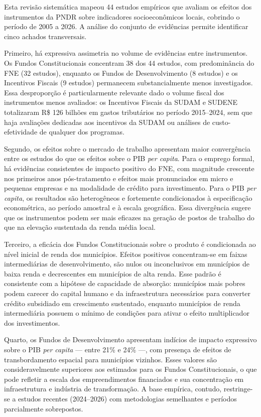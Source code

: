 
Esta revisão sistemática mapeou 44 estudos empíricos que avaliam os efeitos dos instrumentos da PNDR sobre indicadores socioeconômicos locais, cobrindo o período de 2005 a 2026. A análise do conjunto de evidências permite identificar cinco achados transversais.

Primeiro, há expressiva assimetria no volume de evidências entre instrumentos. Os Fundos Constitucionais concentram 38 dos 44 estudos, com predominância do FNE (32 estudos), enquanto os Fundos de Desenvolvimento (8 estudos) e os Incentivos Fiscais (9 estudos) permanecem substancialmente menos investigados. Essa desproporção é particularmente relevante dado o volume fiscal dos instrumentos menos avaliados: os Incentivos Fiscais da SUDAM e SUDENE totalizaram R\$ 126 bilhões em gastos tributários no período 2015--2024, sem que haja avaliações dedicadas aos incentivos da SUDAM ou análises de custo-efetividade de qualquer dos programas.

Segundo, os efeitos sobre o mercado de trabalho apresentam maior convergência entre os estudos do que os efeitos sobre o PIB \textit{per capita}. Para o emprego formal, há evidências consistentes de impacto positivo do FNE, com magnitude crescente nos primeiros anos pós-tratamento e efeitos mais pronunciados em micro e pequenas empresas e na modalidade de crédito para investimento. Para o PIB \textit{per capita}, os resultados são heterogêneos e fortemente condicionados à especificação econométrica, ao período amostral e à escala geográfica. Essa divergência sugere que os instrumentos podem ser mais eficazes na geração de postos de trabalho do que na elevação sustentada da renda média local.

Terceiro, a eficácia dos Fundos Constitucionais sobre o produto é condicionada ao nível inicial de renda dos municípios. Efeitos positivos concentram-se em faixas intermediárias de desenvolvimento, são nulos ou inconclusivos em municípios de baixa renda e decrescentes em municípios de alta renda. Esse padrão é consistente com a hipótese de capacidade de absorção: municípios mais pobres podem carecer do capital humano e da infraestrutura necessários para converter crédito subsidiado em crescimento sustentado, enquanto municípios de renda intermediária possuem o mínimo de condições para ativar o efeito multiplicador dos investimentos.

Quarto, os Fundos de Desenvolvimento apresentam indícios de impacto expressivo sobre o PIB \textit{per capita} --- entre 21\% e 24\% ---, com presença de efeitos de transbordamento espacial para municípios vizinhos. Esses valores são consideravelmente superiores aos estimados para os Fundos Constitucionais, o que pode refletir a escala dos empreendimentos financiados e sua concentração em infraestrutura e indústria de transformação. A base empírica, contudo, restringe-se a estudos recentes (2024--2026) com metodologias semelhantes e períodos parcialmente sobrepostos.

